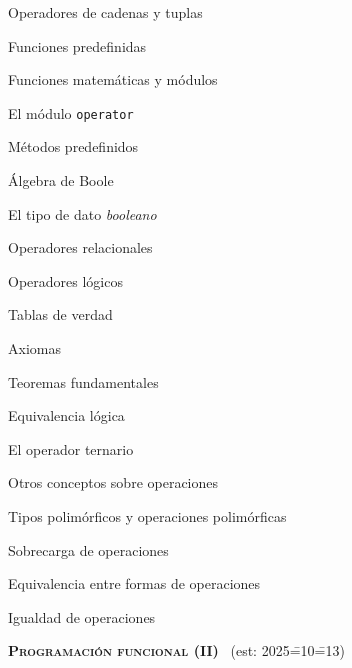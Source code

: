 \begin{longenum}
\begin{longenum}
\begin{longenum}
\begin{longenum}
                \item Operadores de cadenas y tuplas
            \end{longenum}
            \item Funciones predefinidas
            \begin{longenum}
                \item Funciones matemáticas y módulos
                \begin{longenum}
                    \item El módulo \texttt{operator}
                \end{longenum}
            \end{longenum}
            \item Métodos predefinidos
        \end{longenum}
        \item Álgebra de Boole
        \begin{longenum}
            \item El tipo de dato \textit{booleano}
            \item Operadores relacionales
            \item Operadores lógicos
            \begin{longenum}
                \item Tablas de verdad
            \end{longenum}
            \item Axiomas
            \item Teoremas fundamentales
            \item Equivalencia lógica
            \item El operador ternario
        \end{longenum}
        \item Otros conceptos sobre operaciones
        \begin{longenum}
            \item Tipos polimórficos y operaciones polimórficas
            \item Sobrecarga de operaciones
            \item Equivalencia entre formas de operaciones
            \item Igualdad de operaciones
        \end{longenum}
    \end{longenum}
    \item \textbf{\textsc{Programación funcional (II)}} \ (est: 2025\==10\==13)
    \begin{longenum}

\end{longenum}
\end{longenum}
